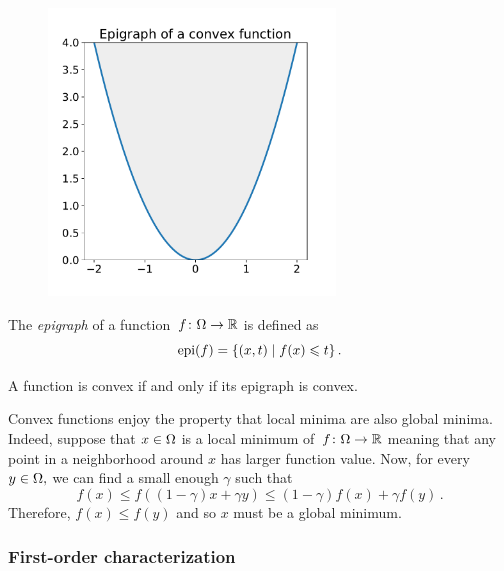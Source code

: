 \begin{figure}
\begin{center}
\includegraphics[width=3in]{figures/lecture1-epigraph}
\end{center}
\end{figure}
\begin{definition}

The \emph{epigraph} of a function~$f\colon \Omega\to\mathbb{R}$ is defined as 
\[
\mathrm{epi}(f) = \{(x, t)\mid f(x)\leqslant t\}\,.
\]
\end{definition}

\begin{fact}
A function is convex if and only if its epigraph is convex.
\end{fact}

Convex functions enjoy the property that local minima are also global minima. Indeed, suppose that $x\in\Omega$ is a local minimum of~$f\colon\Omega\to\mathbb{R}$ meaning that any point in a neighborhood around $x$ has larger function value. Now, for every $y\in\Omega,$ we can find a small enough $\gamma$ such that
\[
f(x) \le f((1-\gamma)x+\gamma y) \le (1-\gamma)f(x)+\gamma f(y)\,.
\]
Therefore, $f(x)\le f(y)$ and so $x$ must be a global minimum.

\subsubsection{First-order characterization}

